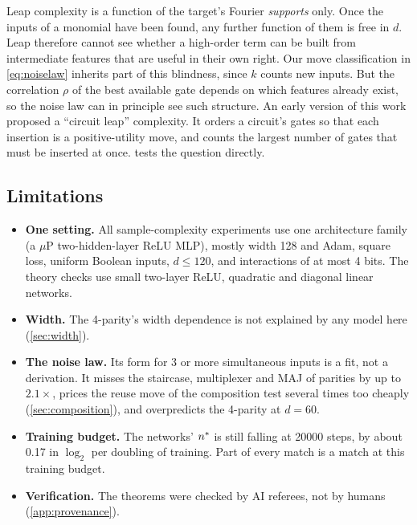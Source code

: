 Leap complexity is a function of the target's Fourier \emph{supports} only. Once the inputs of a monomial have been found, any further function of them is free in $d$. Leap therefore cannot see whether a high-order term can be built from intermediate features that are useful in their own right. Our move classification in \eqref{eq:noiselaw} inherits part of this blindness, since $k$ counts new inputs. But the correlation $\rho$ of the best available gate depends on which features already exist, so the noise law can in principle see such structure. An early version of this work proposed a ``circuit leap'' complexity. It orders a circuit's gates so that each insertion is a positive-utility move, and counts the largest number of gates that must be inserted at once.  tests the question directly.

\subsection{Limitations}
\begin{itemize}
\item \textbf{One setting.} All sample-complexity experiments use one architecture family (a $\mu$P two-hidden-layer ReLU MLP), mostly width 128 and Adam, square loss, uniform Boolean inputs, $d\le120$, and interactions of at most 4 bits. The theory checks use small two-layer ReLU, quadratic and diagonal linear networks.
\item \textbf{Width.} The 4-parity's width dependence is not explained by any model here (\cref{sec:width}).
\item \textbf{The noise law.} Its form for 3 or more simultaneous inputs is a fit, not a derivation. It misses the staircase, multiplexer and MAJ of parities by up to $2.1\times$, prices the reuse move of the composition test several times too cheaply (\cref{sec:composition}), and overpredicts the 4-parity at $d=60$.
\item \textbf{Training budget.} The networks' $n^{*}$ is still falling at 20000 steps, by about 0.17 in $\log_2$ per doubling of training. Part of every match is a match at this training budget.
\item \textbf{Verification.} The theorems were checked by AI referees, not by humans (\cref{app:provenance}).
\end{itemize}

